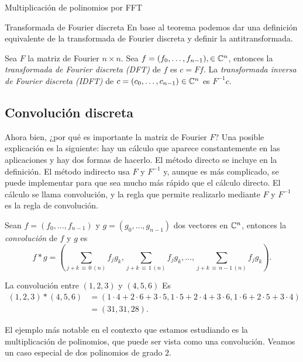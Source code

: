 \begin{chapter}{Multiplicación de polinomios por FFT}
\begin{section}{Transformada de Fourier discreta}
  En  base al teorema podemos dar una definición equivalente de la transformada de Fourier discreta y definir la antitransformada.

  \begin{definicion}
      Sea $F$ la matriz de Fourier $n \times n$. Sea  $f = (f_0,\ldots,f_{n-1}), \in \mathbb C^n$, entonces la \textit{transformada de Fourier discreta (DFT)} de $f$ es $c = Ff$. La \textit{transformada inversa de Fourier discreta (IDFT)} de $c = (c_0,\ldots,c_{n-1}) \in \mathbb C^n$ es $F^{-1}c$.
  \end{definicion}

  \subsection*{Convolución discreta}

  Ahora bien, ¿por  qué es importante la matriz de Fourier $F$? Una posible explicación es la siguiente: hay un cálculo que aparece constantemente en las aplicaciones y hay dos formas de hacerlo. El método directo se incluye en la definición. El método indirecto usa $F$ y $F^{-1}$ y, aunque es más complicado, se puede implementar para que sea mucho más rápido que el cálculo directo. El cálculo se llama {convolución}, y la regla que permite realizarlo mediante  $F$ y $F^{-1}$ es la {regla de convolución.}

  \begin{definicion}
      Sean $f = (f_0,\ldots, f_{n-1})$ y $g = (g_0,\ldots, g_{n-1})$ dos vectores en $\mathbb C^n$,  entonces la  \textit{convolución} de $f$ y $g$ es
      \begin{equation*}
          f * g = \left(\sum_{j+k \,\equiv\, 0\, (n)} f_jg_k, \sum_{j+k \,\equiv\, 1\, (n)} f_jg_k, \ldots, \sum_{j+k\, \equiv\, n-1 \,(n)} f_jg_k\right).
      \end{equation*}
  \end{definicion}

  \begin{ejemplo}
      La convolución entre $(1,2,3)$ y $(4,5,6)$ Es
      \begin{align*}
          (1,2,3)*(4,5,6) & = (1 \cdot 4 + 2\cdot 6 + 3\cdot 5, 1\cdot 5+  2\cdot 4 + 3\cdot 6, 1\cdot 6 + 2\cdot 5 + 3\cdot 4) \\ &= (31, 31, 28).
      \end{align*}
  \end{ejemplo}

  \begin{ejemplo}\label{ejem-convolucion-polinomios}
      El ejemplo más notable en el contexto  que estamos estudiando es la multiplicación de polinomios, que puede ser vista como  una convolución. Veamos un caso especial de dos polinomios de grado $2$.


\end{ejemplo}
\end{section}
\end{chapter}
